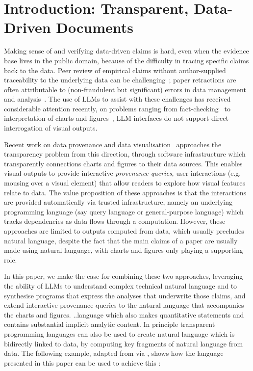 \section{Introduction: Transparent, Data-Driven Documents}

Making sense of and verifying data-driven claims is hard, even when the evidence base lives in the public
domain, because of the difficulty in tracing specific claims back to the data. Peer review of empirical claims
without author-supplied traceability to the underlying data can be challenging~\citep{weber20}; paper
retractions are often attributable to (non-fraudulent but significant) errors in data management and
analysis~\citep{hu25}. The use of LLMs to assist with these challenges has received considerable attention
recently, on problems ranging from fact-checking~\citep{abu-ahmad25} to interpretation of charts and
figures~\citep{roberts24}, LLM interfaces do not support direct interrogation of visual outputs.

Recent work on data provenance and data visualisation~\citep{psallidas18smoke,perera22,bond25} approaches the
transparency problem from this direction, through software infrastructure which transparently connections
charts and figures to their data sources. 
This enables visual outputs to provide interactive \emph{provenance queries}, user interactions (e.g. mousing
over a visual element) that allow readers to explore how visual features relate to data. The value proposition
of these approaches is that the interactions are provided automatically via trusted infrastructure, namely an
underlying programming language (say query language or general-purpose language) which tracks dependencies as
data flows through a computation. However, these approaches are limited to outputs computed from data, which
usually precludes natural language, despite the fact that the main claims of a paper are usually made using
natural language, with charts and figures only playing a supporting role.

In this paper, we make the case for combining these two approaches, leveraging the ability of LLMs to
understand complex technical natural language and to synthesise programs that express the analyses that
underwrite those claims, and extend interactive provenance queries to the natural language that accompanies
the charts and figures.  ..language which also makes quantitative statements and contains substantial implicit
analytic content. In principle transparent programming languages can also be used to create natural language
which is bidirectly linked to data, by computing key fragments of natural language from data. The following
example, adapted from \cite{zhang18} via \cite{moosavi21}, shows how the language presented in this paper can
be used to achieve this :

